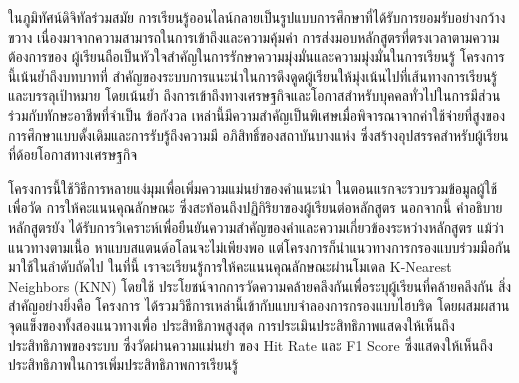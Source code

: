 \maketitle
\makesignature

\ifproject
\begin{abstractTH}

ในภูมิทัศน์ดิจิทัลร่วมสมัย การเรียนรู้ออนไลน์กลายเป็นรูปแบบการศึกษาที่ได้รับการยอมรับอย่างกว้างขวาง 
เนื่องมาจากความสามารถในการเข้าถึงและความคุ้มค่า การส่งมอบหลักสูตรที่ตรงเวลาตามความต้องการของ%
ผู้เรียนถือเป็นหัวใจสำคัญในการรักษาความมุ่งมั่นและความมุ่งมั่นในการเรียนรู้ โครงการนี้เน้นย้ำถึงบทบาทที่%
สำคัญของระบบการแนะนำในการดึงดูดผู้เรียนให้มุ่งเน้นไปที่เส้นทางการเรียนรู้และบรรลุเป้าหมาย โดยเน้นย้ำ%
ถึงการเข้าถึงทางเศรษฐกิจและโอกาสสำหรับบุคคลทั่วไปในการมีส่วนร่วมกับทักษะอาชีพที่จำเป็น ข้อกังวล%
เหล่านี้มีความสำคัญเป็นพิเศษเมื่อพิจารณาจากค่าใช้จ่ายที่สูงของการศึกษาแบบดั้งเดิมและการรับรู้ถึงความมี%
อภิสิทธิ์ของสถาบันบางแห่ง ซึ่งสร้างอุปสรรคสำหรับผู้เรียนที่ด้อยโอกาสทางเศรษฐกิจ

โครงการนี้ใช้วิธีการหลายแง่มุมเพื่อเพิ่มความแม่นยำของคำแนะนำ ในตอนแรกจะรวบรวมข้อมูลผู้ใช้เพื่อวัด%
การให้คะแนนคุณลักษณะ ซึ่งสะท้อนถึงปฏิกิริยาของผู้เรียนต่อหลักสูตร นอกจากนี้ คำอธิบายหลักสูตรยัง%
ได้รับการวิเคราะห์เพื่อยืนยันความสำคัญของคำและความเกี่ยวข้องระหว่างหลักสูตร แม้ว่าแนวทางตามเนื้อ%
หาแบบสแตนด์อโลนจะไม่เพียงพอ แต่โครงการก็นำแนวทางการกรองแบบร่วมมือกันมาใช้ในลำดับถัดไป %
ในที่นี้ เราจะเรียนรู้การให้คะแนนคุณลักษณะผ่านโมเดล K-Nearest Neighbors (KNN) โดยใช้%
ประโยชน์จากการวัดความคล้ายคลึงกันเพื่อระบุผู้เรียนที่คล้ายคลึงกัน สิ่งสำคัญอย่างยิ่งคือ โครงการ%
ได้รวมวิธีการเหล่านี้เข้ากับแบบจำลองการกรองแบบไฮบริด โดยผสมผสานจุดแข็งของทั้งสองแนวทางเพื่อ%
ประสิทธิภาพสูงสุด การประเมินประสิทธิภาพแสดงให้เห็นถึงประสิทธิภาพของระบบ ซึ่งวัดผ่านความแม่นยำ%
ของ Hit Rate และ F1 Score ซึ่งแสดงให้เห็นถึงประสิทธิภาพในการเพิ่มประสิทธิภาพการเรียนรู้

\end{abstractTH}

